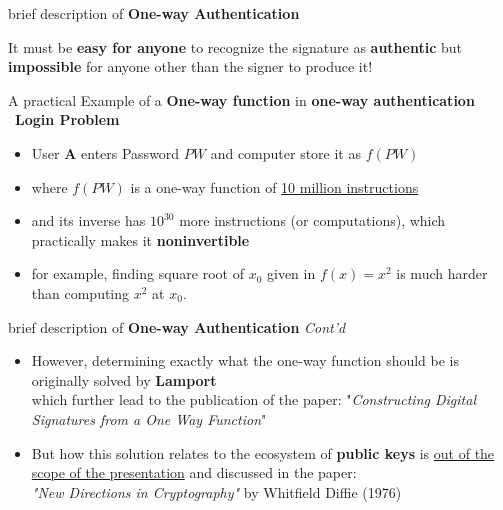 \documentclass{beamer}
\begin{document}

\begin{frame}{brief description of \textbf{One-way Authentication}}
	\begin{definition}
		It must be \textbf{easy for anyone} to recognize the signature as \textbf{authentic} but \textbf{impossible} for anyone other than the signer to produce it!\footnotemark
	\end{definition}
\end{frame}


\begin{frame}{A practical Example of a \textbf{One-way function} in \textbf{one-way authentication} \\ \ \textbf{Login Problem}}
	\begin{itemize}
		\item<1-> User \textbf{A} enters Password \textbf{$PW$} and computer store it as \textbf{$f(PW)$} 
		\item<2-> where $f(PW)$ is a one-way function of \underline{10 million instructions}
		\item <3-> and its inverse has $10^{30}$ more instructions (or computations), which practically makes it \textbf{noninvertible}
		\item <4-> for example, finding square root of $x_0$ given in $f(x)=x^2$ is much harder than computing $x^2$ at $x_0$.
	\end{itemize}
\end{frame}


\begin{frame}{brief description of \textbf{One-way Authentication} \textit{Cont'd}}
	\begin{itemize}
	\item <1-1>However, determining exactly what the one-way function should be is originally solved by \textbf{Lamport} \\ which further lead to the publication of the paper: "\textit{Constructing Digital Signatures from a One Way Function}"
	\item<2-> But how this solution relates to the ecosystem of \textbf{public keys} is \underline {out of the scope of the presentation} and discussed in the paper:\\ \textit{"New Directions in Cryptography"} by Whitfield Diffie (1976) 
\end{itemize}
\end{frame}
\end{document}
